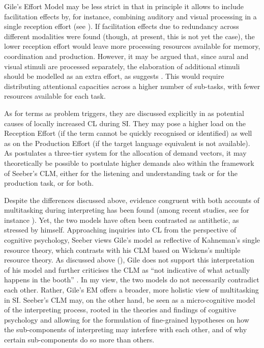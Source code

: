 Gile's Effort Model may be less strict in that in principle it allows to include facilitation effects by, for instance, combining auditory and visual processing in a single reception effort (see \citealt{gile_basic_2009}). If facilitation effects due to redundancy across different modalities were found (though, at present, this is not yet the case), the lower reception effort would leave more processing resources available for memory, coordination and production. However, it may be argued that, since aural and visual stimuli are processed separately, the elaboration of additional stimuli should be modelled as an extra effort, as suggests \citet[74]{gieshoff_impact_2018}. This would require distributing attentional capacities across a higher number of sub-tasks, with fewer resources available for each task.

As for terms as problem triggers, they are discussed explicitly in \citet{gile_basic_2009} as potential causes of locally increased CL during SI. They may pose a higher load on the Reception Effort (if the term cannot be quickly recognised or identified) as well as on the Production Effort (if the target language equivalent is not available). As \citet{wickens_multiple_2002} postulates a three-tier system for the allocation of demand vectors, it may theoretically be possible to postulate higher demands also within the framework of Seeber's CLM, either for the listening and understanding task or for the production task, or for both.

Despite the differences discussed above, evidence congruent with both accounts of multitasking during interpreting has been found (among recent studies, see for instance \citealt{chmiel_eye_2020,gieshoff_impact_2021,seeber_when_2020}). Yet, the two models have often been contrasted as antithetic, as stressed by \citet{seeber_cognitive_2011} himself. Approaching inquiries into CL from the perspective of cognitive psychology, Seeber views Gile's model as reflective of Kahneman's single resource theory, which contrasts with his CLM based on Wickens's multiple resource theory. As discussed above (), Gile does not support this interpretation of his model and further criticises the CLM as ``not indicative of what actually happens in the booth'' \citep[9]{gile_2020_2020}. In my view, the two models do not necessarily contradict each other. Rather, Gile's EM offers a broader, more holistic view of multitasking in SI. Seeber's CLM may, on the other hand, be seen as a micro-cognitive model of the interpreting process, rooted in the theories and findings of cognitive psychology and allowing for the formulation of fine-grained hypotheses on how the sub-components of interpreting may interfere with each other, and of why certain sub-components do so more than others.

